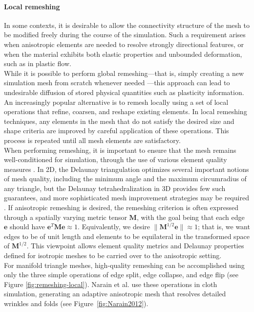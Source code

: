 \paragraph*{Local remeshing}
In some contexts, it is desirable to allow the connectivity structure of the mesh to be modified freely during the course of the simulation.
Such a requirement arises when anisotropic elements are needed to resolve strongly directional features, or when the material exhibits both elastic properties and unbounded deformation, such as in plastic flow.
\\
While it is possible to perform global remeshing---that is, simply creating a new simulation mesh from scratch whenever needed \cite{Klingner2006,Bargteil2007}---this approach can lead to undesirable diffusion of stored physical quantities such as plasticity information.
An increasingly popular alternative is to remesh locally using a set of local operations that refine, coarsen, and reshape existing elements.
In local remeshing techniques, any elements in the mesh that do not satisfy the desired size and shape criteria are improved by careful application of these operations.
This process is repeated until all mesh elements are satisfactory.
\\
When performing remeshing, it is important to ensure that the mesh remains well-conditioned for simulation, through the use of various element quality measures \cite{Shewchuk2002}.
In 2D, the Delaunay triangulation optimizes several important notions of mesh quality, including the minimum angle and the maximum circumradius of any triangle, but the Delaunay tetrahedralization in 3D provides few such guarantees, and more sophisticated mesh improvement strategies may be required \cite{Wicke2010}.
If anisotropic remeshing is desired, the remeshing criterion is often expressed through a spatially varying metric tensor $\mathbf M$, with the goal being that each edge $\mathbf e$ should have $\mathbf e^T\mathbf M\mathbf e\approx1$.
Equivalently, we desire $\|\mathbf M^{1/2}\mathbf e\|\approx1$; that is, we want edges to be of unit length and elements to be equilateral in the transformed space of $\mathbf M^{1/2}$.
This viewpoint allows element quality metrics and Delaunay properties defined for isotropic meshes to be carried over to the anisotropic setting.
\\
For manifold triangle meshes, high-quality remeshing can be accomplished using only the three simple operations of edge split, edge collapse, and edge flip (see Figure \ref{fig:remeshing-local}).
Narain et al. \cite{Narain2012} use these operations in cloth simulation, generating an adaptive anisotropic mesh that resolves detailed wrinkles and folds (see Figure~\ref{fig:Narain2012}).
